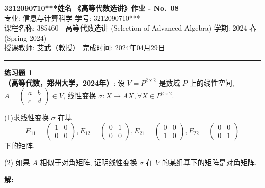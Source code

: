 \documentclass[a4paper, 11pt]{article}
\newenvironment{problem}[2][练习题]
    { \begin{mdframed}[backgroundcolor=gray!5] \textbf{#1 #2} \\}
    {  \end{mdframed}}
\newenvironment{solution}
    {\textbf{解:}}
    {}
\begin{document}
\noindent
\large\textbf{3212090710***\quad 姓名} \hfill \textbf{《高等代数选讲》作业 - No.~\Huge{08}}   \\
专业: 信息与计算科学 \hfill 学号: 3212090710*** \\
\normalsize 课程名称: 385460 - 高等代数选讲 (Selection of Advanced Algebra) \hfill 学期: 2024 春 (Spring 2024)\\
授课教师: 艾武（教授） \hfill 完成时间: 2024年04月29日 \\
\noindent\rule{7in}{1.8pt}

\begin{problem}{1}
\textbf{（高等代数，郑州大学，2024年）}: 设 $V=P^{2 \times 2}$ 是数域 $P$ 上的线性空间, $A=\left(\begin{array}{ll}a & b \\ c & d\end{array}\right) \in V$, 线性变换 $\sigma: X \rightarrow A X, \forall X \in P^{2 \times 2}$.

(1)求线性变换 $\sigma$ 在基
$$
E_{11}=\left(\begin{array}{ll}
1 & 0 \\
0 & 0
\end{array}\right), E_{12}=\left(\begin{array}{ll}
0 & 1 \\
0 & 0
\end{array}\right), E_{21}=\left(\begin{array}{ll}
0 & 0 \\
1 & 0
\end{array}\right), E_{22}=\left(\begin{array}{ll}
0 & 0 \\
0 & 1
\end{array}\right)
$$
下的矩阵.

(2) 如果 $A$ 相似于对角矩阵, 证明线性变换 $\sigma$ 在 $V$ 的某组基下的矩阵是对角矩阵.
\end{problem}

\begin{solution}

\end{solution} 
\end{document}
